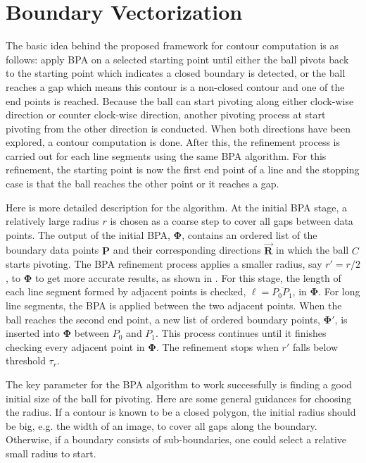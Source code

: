 \section{Boundary Vectorization}
The basic idea behind the proposed framework for contour computation is as follows:
apply BPA on a selected starting point until
either the ball pivots back to the starting point 
which indicates a closed boundary is detected,
or the ball reaches a gap which means this contour is a non-closed
contour and one of the end points is reached.
Because the ball can start pivoting along either clock-wise direction 
or counter clock-wise direction,
another pivoting process at start pivoting from the other direction is conducted.
When both directions have been explored, a contour computation is done.
After this, the refinement process is carried out 
for each line segments using the same BPA algorithm.
For this refinement, the starting point is now the first end point of a line
and the stopping case is that the ball reaches the other point or it reaches a gap.

Here is more detailed description for the algorithm.
At the initial BPA stage, a relatively large radius $r$ is chosen 
as a coarse step to cover all gaps between data points.
The output of the initial BPA, $\boldsymbol{\Phi}$, 
contains an ordered list of the boundary data points $\boldsymbol{P}$ 
and their corresponding directions $\overrightarrow{\boldsymbol{R}}$ 
in which the ball $C$ starts pivoting.
The BPA refinement process applies a smaller radius, say $r' = r/2$,
to $\boldsymbol{\Phi}$ to get more accurate results, as shown in .
For this stage, the length of each line segment formed by adjacent points is checked,
$\ell = \overline{P_0P_1}$, in $\boldsymbol{\Phi}$.
For long line segments, the BPA is applied between the two adjacent points.
When the ball reaches the second end point, a new list of ordered boundary points,
$\boldsymbol{\Phi'}$, is inserted into $\boldsymbol{\Phi}$ between $P_0$ and $P_1$.
This process continues until it finishes 
checking every adjacent point in $\boldsymbol{\Phi}$.
The refinement stops when $r'$ falls below threshold $\tau_r$.

The key parameter for the BPA algorithm to work successfully is finding
a good initial size of the ball for pivoting.
Here are some general guidances for choosing the radius. 
If a contour is known to be a closed polygon,
the initial radius should be big, e.g. the width of an image, 
to cover all gaps along the boundary.
Otherwise, if a boundary consists of sub-boundaries, 
one could select a relative small radius to start.

